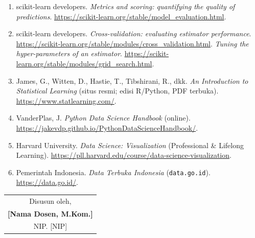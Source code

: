 \documentclass[12pt,a4paper]{article}
\begin{document}
\begin{enumerate}[leftmargin=*]
  \item scikit-learn developers. \textit{Metrics and scoring: quantifying the quality of predictions}. \url{https://scikit-learn.org/stable/model_evaluation.html}.

  \item scikit-learn developers. \textit{Cross-validation: evaluating estimator performance}. \url{https://scikit-learn.org/stable/modules/cross_validation.html}. \textit{Tuning the hyper-parameters of an estimator}. \url{https://scikit-learn.org/stable/modules/grid_search.html}.

  \item James, G., Witten, D., Hastie, T., Tibshirani, R., dkk. \textit{An Introduction to Statistical Learning} (situs resmi; edisi R/Python, PDF terbuka). \url{https://www.statlearning.com/}.

  \item VanderPlas, J. \textit{Python Data Science Handbook} (online). \url{https://jakevdp.github.io/PythonDataScienceHandbook/}.

  \item Harvard University. \textit{Data Science: Visualization} (Professional \& Lifelong Learning). \url{https://pll.harvard.edu/course/data-science-visualization}.

  \item Pemerintah Indonesia. \textit{Data Terbuka Indonesia} (\texttt{data.go.id}). \url{https://data.go.id/}.
\end{enumerate}

\vspace{1cm}

\begin{flushright}
\begin{tabular}{c}
Disusun oleh,\\[2cm]
\textbf{[Nama Dosen, M.Kom.]}\\
NIP. [NIP]
\end{tabular}
\end{flushright}
\end{document}
